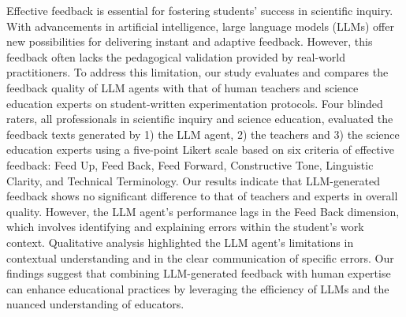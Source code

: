 
Effective feedback is essential for fostering students' success in scientific inquiry. With advancements in artificial intelligence, large language models (LLMs) offer new possibilities for delivering instant and adaptive feedback. However, this feedback often lacks the pedagogical validation provided by real-world practitioners. 
To address this limitation, our study evaluates and compares the feedback quality of LLM agents with that of human teachers and science education experts on student-written experimentation protocols.
Four blinded raters, all professionals in scientific inquiry and science education, evaluated the feedback texts generated by 1) the LLM agent, 2) the teachers and 3) the science education experts using a five-point Likert scale based on six criteria of effective feedback: Feed Up, Feed Back, Feed Forward, Constructive Tone, Linguistic Clarity, and Technical Terminology. 
Our results indicate that LLM-generated feedback shows no significant difference to that of teachers and experts in overall quality.
However, the LLM agent's performance lags in the Feed Back dimension, which involves identifying and explaining errors within the student’s work context. Qualitative analysis highlighted the LLM agent’s limitations in contextual understanding and in the clear communication of specific errors.
Our findings suggest that combining LLM-generated feedback with human expertise can enhance educational practices by leveraging the efficiency of LLMs and the nuanced understanding of educators.
